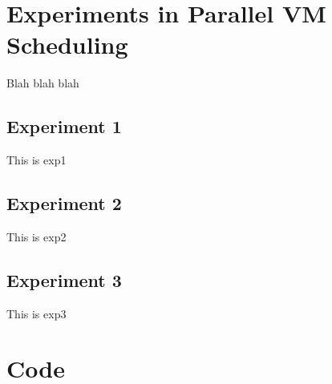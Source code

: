 \documentclass{article}
\begin{document}
\section{Experiments in Parallel VM Scheduling}

Blah blah blah

\subsection{Experiment 1}

This is exp1

\subsection{Experiment 2}

This is exp2

\subsection{Experiment 3}

This is exp3

\section{Code}








\end{document}
